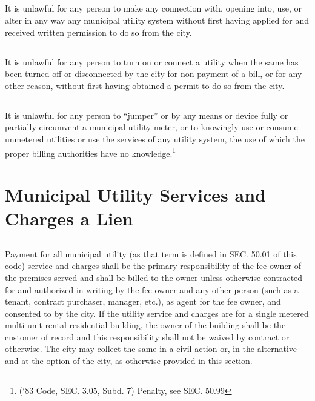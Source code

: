 \subsection{}
It is unlawful for any person to make any connection with, opening into, use, or alter in any way any municipal utility system without first having applied for and received written permission to do so from the city.
\subsection{}
It is unlawful for any person to turn on or connect a utility when the same has been turned off or disconnected by the city for non-payment of a bill, or for any other reason, without first having obtained a permit to do so from the city.
\subsection{}
It is unlawful for any person to “jumper” or by any means or device fully or partially circumvent a municipal utility meter, or to knowingly use or consume unmetered utilities or use the services of any utility system, the use of which the proper billing authorities have no knowledge.\footnote{(‘83 Code, SEC. 3.05, Subd. 7)  Penalty, see SEC. 50.99}

\section{Municipal Utility Services and Charges a Lien}
\subsection{}
Payment for all municipal utility (as that term is defined in SEC. 50.01 of this code) service and charges shall be the primary responsibility of the fee owner of the premises served and shall be billed to the owner unless otherwise contracted for and authorized in writing by the fee owner and any other person (such as a tenant, contract purchaser, manager, etc.), as agent for the fee owner, and consented to by the city.  If the utility service and charges are for a single metered multi-unit rental residential building, the owner of the building shall be the customer of record and this responsibility shall not be waived by contract or otherwise.  The city may collect the same in a civil action or, in the alternative and at the option of the city, as otherwise provided in this section.
